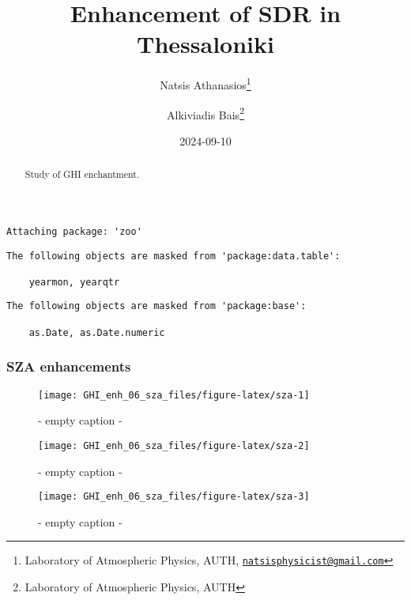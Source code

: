 \documentclass[
  10pt,
  a4paper,oneside]{article}
\title{Enhancement of SDR in Thessaloniki}
\author{Natsis Athanasios\footnote{Laboratory of Atmospheric Physics, AUTH, \href{mailto:natsisphysicist@gmail.com}{\nolinkurl{natsisphysicist@gmail.com}}} \and Alkiviadis Bais\footnote{Laboratory of Atmospheric Physics, AUTH}}
\date{2024-09-10}
\begin{document}
\maketitle
\begin{abstract}
Study of GHI enchantment.
\end{abstract}

{
\hypersetup{linkcolor=}
\setcounter{tocdepth}{4}
\tableofcontents
}
\begin{verbatim}
Attaching package: 'zoo'
\end{verbatim}

\begin{verbatim}
The following objects are masked from 'package:data.table':

    yearmon, yearqtr
\end{verbatim}

\begin{verbatim}
The following objects are masked from 'package:base':

    as.Date, as.Date.numeric
\end{verbatim}

\newpage
\FloatBarrier

\hypertarget{sza-enhancements}{%
\subsubsection{SZA enhancements}\label{sza-enhancements}}

\begin{figure}[H]

{\centering \texttt{[image: GHI\_enh\_06\_sza\_files/figure-latex/sza-1]} 

}

\caption{ - empty caption - }\label{fig:sza-1}
\end{figure}
\begin{figure}[H]

{\centering \texttt{[image: GHI\_enh\_06\_sza\_files/figure-latex/sza-2]} 

}

\caption{ - empty caption - }\label{fig:sza-2}
\end{figure}
\begin{figure}[H]

{\centering \texttt{[image: GHI\_enh\_06\_sza\_files/figure-latex/sza-3]} 

}

\caption{ - empty caption - }\label{fig:sza-3}
\end{figure}
\end{document}
